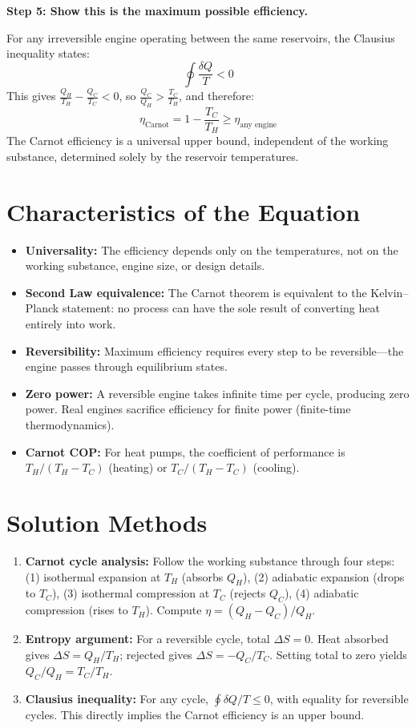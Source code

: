 \documentclass[11pt,openright]{book}
\begin{document}
\textbf{Step 5: Show this is the maximum possible efficiency.}

For any irreversible engine operating between the same reservoirs, the Clausius inequality states:
\begin{equation}
\oint \frac{\delta Q}{T} < 0
\end{equation}
This gives $\frac{Q_H}{T_H} - \frac{Q_C}{T_C} < 0$, so $\frac{Q_C}{Q_H} > \frac{T_C}{T_H}$, and therefore:
\begin{equation}
\boxed{\eta_{\text{Carnot}} = 1 - \frac{T_C}{T_H} \geq \eta_{\text{any engine}}}
\end{equation}
The Carnot efficiency is a universal upper bound, independent of the working substance, determined solely by the reservoir temperatures.

\section*{Characteristics of the Equation}

\begin{itemize}
\item \textbf{Universality:} The efficiency depends only on the temperatures, not on the working substance, engine size, or design details.
\item \textbf{Second Law equivalence:} The Carnot theorem is equivalent to the Kelvin--Planck statement: no process can have the sole result of converting heat entirely into work.
\item \textbf{Reversibility:} Maximum efficiency requires every step to be reversible---the engine passes through equilibrium states.
\item \textbf{Zero power:} A reversible engine takes infinite time per cycle, producing zero power. Real engines sacrifice efficiency for finite power (finite-time thermodynamics).
\item \textbf{Carnot COP:} For heat pumps, the coefficient of performance is $T_H/(T_H - T_C)$ (heating) or $T_C/(T_H - T_C)$ (cooling).
\end{itemize}
\section*{Solution Methods}

\begin{enumerate}
\item \textbf{Carnot cycle analysis:} Follow the working substance through four steps: (1) isothermal expansion at $T_H$ (absorbs $Q_H$), (2) adiabatic expansion (drops to $T_C$), (3) isothermal compression at $T_C$ (rejects $Q_C$), (4) adiabatic compression (rises to $T_H$). Compute $\eta = (Q_H - Q_C)/Q_H$.
\item \textbf{Entropy argument:} For a reversible cycle, total $\Delta S = 0$. Heat absorbed gives $\Delta S = Q_H/T_H$; rejected gives $\Delta S = -Q_C/T_C$. Setting total to zero yields $Q_C/Q_H = T_C/T_H$.
\item \textbf{Clausius inequality:} For any cycle, $\oint \delta Q/T \leq 0$, with equality for reversible cycles. This directly implies the Carnot efficiency is an upper bound.
\end{enumerate}
\end{document}
